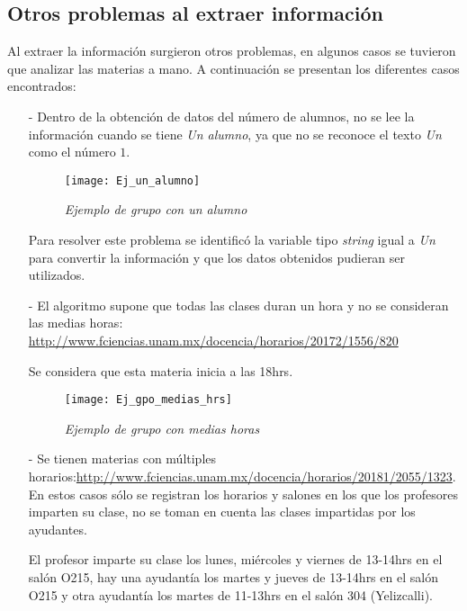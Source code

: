 \subsection{Otros problemas al extraer información}

Al extraer la información surgieron otros problemas, en algunos casos se tuvieron que analizar las materias a mano. A continuación se presentan los diferentes casos encontrados:

\begin{itemize}
\item[-] Dentro de la obtención de datos del número de alumnos, no se lee la información cuando se tiene \textit{Un alumno}, ya que no se reconoce el texto \textit{Un} como el número $1$.

\begin{figure}[H]
\centering
\texttt{[image: Ej\_un\_alumno]} %
\caption{\textit{Ejemplo de grupo con un alumno}}
\end{figure}

Para resolver este problema se identificó la variable tipo \textit{string} igual a \textit{Un} para convertir la información y que los datos obtenidos pudieran ser utilizados.
  
\item[-] El algoritmo supone que todas las clases duran un hora y no se consideran las medias horas: \url{http://www.fciencias.unam.mx/docencia/horarios/20172/1556/820}

Se considera que esta materia inicia a las 18hrs.
  
\begin{figure}[H]
\centering
\texttt{[image: Ej\_gpo\_medias\_hrs]} %
\caption{\textit{Ejemplo de grupo con medias horas}}
\end{figure}

\item[-] Se tienen materias con múltiples horarios:\url{http://www.fciencias.unam.mx/docencia/horarios/20181/2055/1323}. En estos casos sólo se registran los horarios y salones en los que los profesores imparten su clase, no se toman en cuenta las clases impartidas por los ayudantes.
  
  El profesor imparte su clase los lunes, miércoles y viernes de 13-14hrs en el salón O215, hay una ayudantía los martes y jueves de 13-14hrs en el salón O215 y otra ayudantía los martes de 11-13hrs en el salón 304 (Yelizcalli).
  

\end{itemize}

